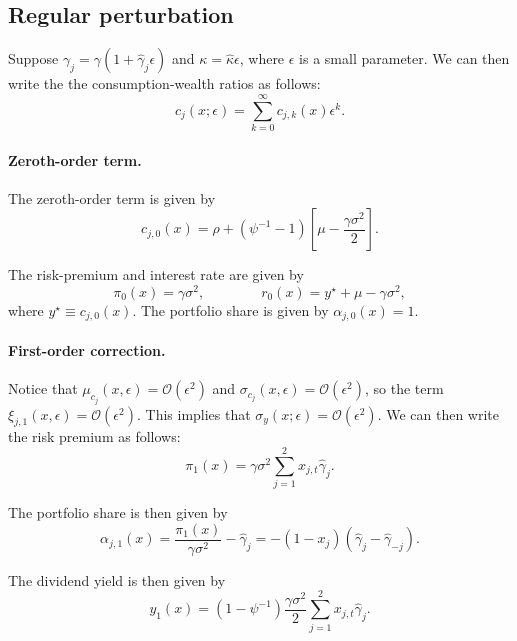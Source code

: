 \documentclass[11pt,english]{article}
\begin{document}
\subsection{Regular perturbation}

Suppose $\gamma_j = \gamma (1+\hat{\gamma}_j \epsilon)$ and $\kappa = \hat{\kappa} \epsilon$, where $\epsilon$ is a small parameter. 
We can then write the the consumption-wealth ratios as follows:
\begin{equation}
    c_j(x;\epsilon) = \sum_{k=0}^\infty c_{j,k}(x) \epsilon^k.
\end{equation}

\paragraph{Zeroth-order term.} The zeroth-order term is given by
\begin{equation}
    c_{j,0}(x) =  \rho + \left(\psi^{-1}-1\right) \left[\mu - \frac{\gamma \sigma^2}{2}  \right].  
\end{equation}

The risk-premium and interest rate are given by
\begin{equation}
    \pi_0(x) = \gamma \sigma^2, \qquad \qquad 
    r_0(x) = y^\star + \mu  - \gamma \sigma^2,
\end{equation}
where $y^\star \equiv c_{j,0}(x)$. The portfolio share is given by $\alpha_{j,0}(x) = 1$.

\paragraph{First-order correction.} Notice that $\mu_{c_j}(x,\epsilon) = \mathcal{O}(\epsilon^2)$ and $\sigma_{c_j}(x,\epsilon) = \mathcal{O}(\epsilon^2)$, so the term $\xi_{j,1}(x,\epsilon) = \mathcal{O}(\epsilon^2)$. This implies that $\sigma_{y}(x;\epsilon) = \mathcal{O}(\epsilon^2)$. We can then write the risk premium as follows:
\begin{equation}
    \pi_1(x) = \gamma \sigma^2 \sum_{j=1}^2 x_{j,t} \hat{\gamma}_j.
\end{equation}

The portfolio share is then given by
\begin{equation}
    \alpha_{j,1}(x) = \frac{\pi_1(x)}{\gamma \sigma^2}  -\hat{\gamma}_j = - (1-x_j) (\hat{\gamma}_j - \hat{\gamma}_{-j}).
\end{equation}

The dividend yield is then given by
\begin{equation}
    y_1(x) = (1-\psi^{-1}) \frac{\gamma \sigma^2}{2} \sum_{j=1}^2 x_{j,t} \hat{\gamma}_j.
\end{equation}
\end{document}

